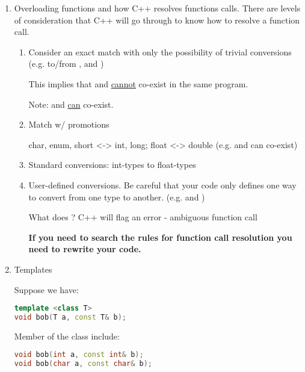\begin{enumerate}
  \item Overloading functions and how C++ resolves functions calls.
There are levels of consideration that C++ will go through to know how to resolve a function call.
  \begin{enumerate}
    \item Consider an exact match with only the possibility of trivial conversions (e.g.  to/from ,  and )

    This implies that  and  \underline{cannot} co-exist in the same program.
    
    Note:  and  \underline{can} co-exist.

    \item Match w/ promotions

    char, enum, short <-> int, long; float <-> double (e.g.  and  can co-exist)

    \item Standard conversions: int-types to float-types

    \item User-defined conversions. Be careful that your code only defines one way to convert from one type to another. (e.g.  and )

    What does ? C++ will flag an error - ambiguous function call

    \textbf{If you need to search the rules for function call resolution you need to rewrite your code.}
  \end{enumerate}

  \item Templates

  Suppose we have:

  \begin{lstlisting}[language=C++]
template <class T>
void bob(T a, const T& b);
  \end{lstlisting}

  Member of the class include:
  
  \begin{lstlisting}[language=C++]
void bob(int a, const int& b);
void bob(char a, const char& b);
  \end{lstlisting}

\end{enumerate}

